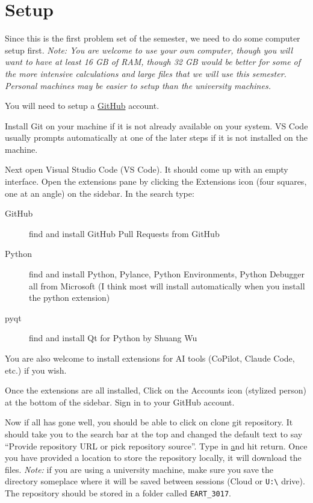 \documentclass[final,a4paper,12pt]{article}
\begin{document}
\maketitle

\section*{Setup}
Since this is the first problem set of the semester, we need to do some computer setup first.  \textit{Note: You are welcome to use your own computer, though you will want to have at least 16 GB of RAM, though 32 GB would be better for some of the more intensive calculations and large files that we will use this semester.  Personal machines may be easier to setup than the university machines.}

You will need to setup a \href{https://github.com}{GitHub} account.

Install Git on your machine if it is not already available on your system. VS Code usually prompts automatically at one of the later steps if it is not installed on the machine.

Next open Visual Studio Code (VS Code).  It should come up with an empty interface.  Open the extensions pane by clicking the Extensions icon (four squares, one at an angle) on the sidebar.  In the search type:
\begin{description}
  \item [GitHub] find and install GitHub Pull Requests from GitHub
  \item [Python] find and install Python, Pylance, Python Environments, Python Debugger all from Microsoft (I think most will install automatically when you install the python extension)
  \item [pyqt] find and install Qt for Python by Shuang Wu
\end{description}

You are also welcome to install extensions for AI tools (CoPilot, Claude Code, etc.) if you wish.

Once the extensions are all installed, Click on the Accounts icon  (stylized person) at the bottom of the sidebar.  Sign in to your GitHub account.

Now if all has gone well, you should be able to click on clone git repository.  It should take you to the search bar at the top and changed the default text to say ``Provide repository URL or pick repository source''.  Type in \href{https://github.com/dhasterok/EART_3017} and hit return.  Once you have provided a location to store the repository locally, it will download the files.  \emph{Note:} if you are using a university machine, make sure you save the directory someplace where it will be saved between sessions (Cloud or \verb+U:\+ drive).  The repository should be stored in a folder called \verb+EART_3017+.
\end{document}
